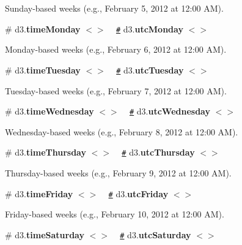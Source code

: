Sunday-\/based weeks (e.\+g., February 5, 2012 at 12\+:00 AM).

\label{_timeMonday}%
\# d3.{\bfseries time\+Monday} \href{https://github.com/d3/d3-time/blob/master/src/week.js#L16}{\tt $<$$>$} ~\newline
\href{#timeMonday}{\tt \#} d3.{\bfseries utc\+Monday} \href{https://github.com/d3/d3-time/blob/master/src/utcWeek.js#L16}{\tt $<$$>$}

Monday-\/based weeks (e.\+g., February 6, 2012 at 12\+:00 AM).

\label{_timeTuesday}%
\# d3.{\bfseries time\+Tuesday} \href{https://github.com/d3/d3-time/blob/master/src/week.js#L17}{\tt $<$$>$} ~\newline
\href{#timeTuesday}{\tt \#} d3.{\bfseries utc\+Tuesday} \href{https://github.com/d3/d3-time/blob/master/src/utcWeek.js#L17}{\tt $<$$>$}

Tuesday-\/based weeks (e.\+g., February 7, 2012 at 12\+:00 AM).

\label{_timeWednesday}%
\# d3.{\bfseries time\+Wednesday} \href{https://github.com/d3/d3-time/blob/master/src/week.js#L18}{\tt $<$$>$} ~\newline
\href{#timeWednesday}{\tt \#} d3.{\bfseries utc\+Wednesday} \href{https://github.com/d3/d3-time/blob/master/src/utcWeek.js#L18}{\tt $<$$>$}

Wednesday-\/based weeks (e.\+g., February 8, 2012 at 12\+:00 AM).

\label{_timeThursday}%
\# d3.{\bfseries time\+Thursday} \href{https://github.com/d3/d3-time/blob/master/src/week.js#L19}{\tt $<$$>$} ~\newline
\href{#timeThursday}{\tt \#} d3.{\bfseries utc\+Thursday} \href{https://github.com/d3/d3-time/blob/master/src/utcWeek.js#L19}{\tt $<$$>$}

Thursday-\/based weeks (e.\+g., February 9, 2012 at 12\+:00 AM).

\label{_timeFriday}%
\# d3.{\bfseries time\+Friday} \href{https://github.com/d3/d3-time/blob/master/src/week.js#L20}{\tt $<$$>$} ~\newline
\href{#timeFriday}{\tt \#} d3.{\bfseries utc\+Friday} \href{https://github.com/d3/d3-time/blob/master/src/utcWeek.js#L20}{\tt $<$$>$}

Friday-\/based weeks (e.\+g., February 10, 2012 at 12\+:00 AM).

\label{_timeSaturday}%
\# d3.{\bfseries time\+Saturday} \href{https://github.com/d3/d3-time/blob/master/src/week.js#L21}{\tt $<$$>$} ~\newline
\href{#timeSaturday}{\tt \#} d3.{\bfseries utc\+Saturday} \href{https://github.com/d3/d3-time/blob/master/src/utcWeek.js#L21}{\tt $<$$>$}

